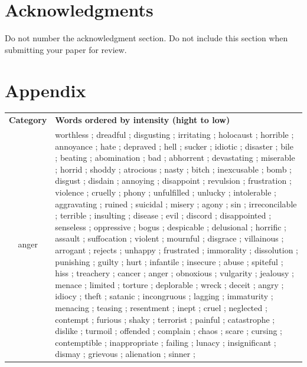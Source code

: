 \documentclass[11pt]{article}
\begin{document}
\section*{Acknowledgments}

Do not number the acknowledgment section. Do not include this section when submitting your paper for review.







\newpage
\section*{Appendix}
\begin{table}[th]%
\begin{center}
\scriptsize
\begin{tabular}{c @{\hspace{0pt}}  @{\hspace{15pt}}p{}}
\toprule[.12em]\addlinespace
{\bf\small Category} & {\bf\small Words ordered by intensity (hight to low) } \\ \addlinespace
\midrule \addlinespace
anger & 
worthless	;
dreadful	;
disgusting	;
irritating	;
holocaust	;
horrible	;
annoyance	;
hate	;
depraved	;
hell	;
sucker	;
idiotic	;
disaster	;
bile	;
beating	;
abomination	;
bad	;
abhorrent	;
devastating	;
miserable	;
horrid	;
shoddy	;
atrocious	;
nasty	;
bitch	;
inexcusable	;
bomb	;
disgust	;
disdain	;
annoying	;
disappoint	;
revulsion	;
frustration	;
violence	;
cruelly	;
phony	;
unfulfilled	;
unlucky	;
intolerable	;
aggravating	;
ruined	;
suicidal	;
misery	;
agony	;
sin	;
irreconcilable	;
terrible	;
insulting	;
disease	;
evil	;
discord	;
disappointed	;
senseless	;
oppressive	;
bogus	;
despicable	;
delusional	;
horrific	;
assault	;
suffocation	;
violent	;
mournful	;
disgrace	;
villainous	;
arrogant	;
rejects	;
unhappy	;
frustrated	;
immorality	;
dissolution	;
punishing	;
guilty	;
hurt	;
infantile	;
insecure	;
abuse	;
spiteful	;
hiss	;
treachery	;
cancer	;
anger	;
obnoxious	;
vulgarity	;
jealousy	;
menace	;
limited	;
torture	;
deplorable	;
wreck	;
deceit	;
angry	;
idiocy	;
theft	;
satanic	;
incongruous	;
lagging	;
immaturity	;
menacing	;
teasing	;
resentment	;
inept	;
cruel	;
neglected	;
contempt	;
furious	;
shaky	;
terrorist	;
painful	;
catastrophe	;
dislike	;
turmoil	;
offended	;
complain	;
chaos	;
scare	;
cursing	;
contemptible	;
inappropriate	;
failing	;
lunacy	;
insignificant	;
dismay	;
grievous	;
alienation	;
sinner	;

\end{tabular}
\end{center}
\end{table}
\end{document}
